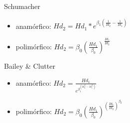 \documentclass[
  letterpaper,
  DIV=11,
  numbers=noendperiod]{scrartcl}
\begin{document}
Schumacher

\begin{itemize}
\item
  anamórfico:
  \(Hd_2 = Hd_1 * e^{\beta_1 \left( \frac{ 1 } { Id_2} - \frac{ 1 } { Id_1 } \right)}\)
\item
  polimórfico:
  \(Hd_2 = \beta_0 \left( \frac{ Hd_1 } { \beta_0 }\right)^{ \frac{ Id_1 } { Id_2 } }\)
\end{itemize}

Bailey \& Clutter

\begin{itemize}
\item
  anamórfico:
  \(Hd_ 2 = \frac{ Hd_1 } { e^{ \beta_1^{ ( Id_ 2 ^{\beta_2} - Id_1 ^{ \beta_2}) } } }\)
\item
  polimórfico:
  \(Hd_2 = \beta_0 \left( \frac{ Hd_1 } { \beta_0 } \right )^{ \left( \frac{ Id_1 } { Id_2 } \right ) ^{ \beta_2 } }\)
\end{itemize}
\end{document}
